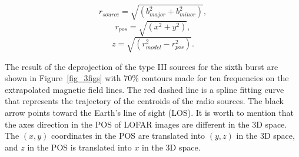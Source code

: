 \begin{equation}
     r_{source} = \sqrt{(b_{major}^2 + b_{minor}^2)}
    \label{source_radius},
\end{equation}
\begin{equation}
    r_{pos} = \sqrt{(x^2 + y^2)}
    \label{rpos},
\end{equation}
\begin{equation}
     z = \sqrt{(r_{model}^2 - r_{pos}^2)}
    \label{zpos}.
\end{equation}

The result of the deprojection of the type III sources for the sixth burst are shown in Figure~\ref{fig_3figs} with 70\% contours made for ten frequencies on the extrapolated magnetic field lines. The red dashed line is a spline fitting curve that represents the trajectory of the centroids of the radio sources. The black arrow points toward the Earth's line of sight (LOS). It is worth to mention that the axes direction in the POS of LOFAR images are different in the 3D space. The $(x,y)$ coordinates in the POS are translated into $(y,z)$ in the 3D space, and $z$ in the POS is translated into $x$ in the 3D space.

